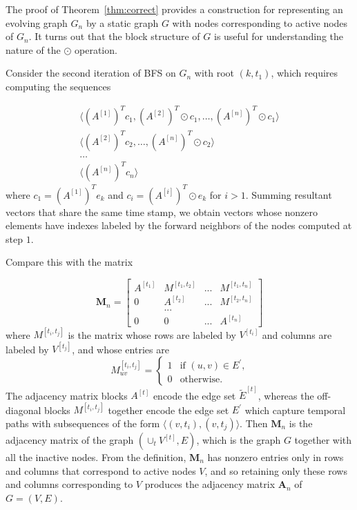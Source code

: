 \documentclass[10pt,conference,compsocconf]{IEEEtran}
\theoremstyle{definition}
\begin{document}
The proof of Theorem~\ref{thm:correct} provides a construction for representing
an evolving graph $G_n$ by a static graph $G$ with nodes corresponding to active
nodes of $G_n$. It turns out that the block structure of $G$ is useful for
understanding the nature of the $\odot$ operation.

Consider the second iteration of BFS on $G_n$ with root $(k, t_1)$, which
requires computing the sequences

\begin{subequations}
\begin{align}
  \label{eq:5}
 \big\langle (A^{[1]})^Tc_1,   (A^{[2]})^T\odot c_1, \ldots,  (A^{[n]})^T\odot c_1  \big\rangle  \\
\big\langle (A^{[2]})^Tc_{2}, \ldots, (A^{[n]})^T\odot c_{2} \big\rangle \\
 \ldots  \\
  \big\langle (A^{[n]})^Tc_n \big\rangle
\label{eq:6}
\end{align}
\end{subequations}
%
where $c_1 = (A^{[1]})^Te_k$ and $c_i = (A^{[i]})^T \odot e_k$ for $i>1$.
Summing resultant vectors that share the same
time stamp, we obtain vectors whose nonzero elements have indexes labeled by
the forward neighbors of the nodes computed at step $1$.

Compare this with the matrix

\[
\bm M_n = \begin{bmatrix}
A^{[t_1]} & M^{[t_1, t_2]} & ... & M^{[t_1, t_n]} \\
        0 & A^{[t_2]}      & ... & M^{[t_2, t_n]} \\
                           &   ... \\
        0 & 0 & ... & A^{[t_n]}
\end{bmatrix}
\]
%
where $M^{[t_i, t_j]}$ is the matrix whose rows are labeled by $V^{[t_i]}$ and
columns are labeled by $V^{[t_j]}$, and whose entries are
\[
M^{[t_i, t_j]}_{uv} =
\begin{cases}
1 & \mbox{if $(u,v)\in E^\prime$,} \\
0 & \mbox{otherwise.}
\end{cases}
\]
%
The adjacency matrix blocks $A^{[t]}$ encode the edge set $\tilde E^{[t]}$,
whereas the off-diagonal blocks $M^{[t_i, t_j]}$ together encode the edge set
$E^\prime$ which capture temporal paths with subsequences of the form
$\langle (v, t_i), (v, t_j) \rangle$. Then $\bm M_n$ is the adjacency matrix of
the graph $(\cup_t V^{[t]}, E)$, which is the graph $G$ together with all the
inactive nodes. From the definition, $\bm M_n$ has nonzero
entries only in rows and columns that correspond to active nodes $V$, and so
retaining only these rows and columns corresponding to $V$ produces the
adjacency matrix $\bm A_n$ of $G = (V, E)$.
\end{document}

